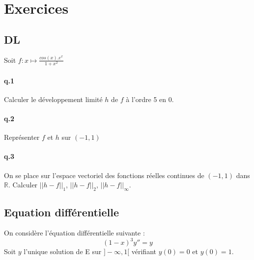 \documentclass[10pt,a4paper]{article}
\begin{document}
%
%
%
%



\section{Exercices}
\subsection{DL}
Soit $f: x \mapsto \frac{cos(x).e^x}{1+x^2} $
\paragraph{q.1} Calculer le développement limité $h$ de $f$ à l'ordre 5 en 0.
\paragraph{q.2} Représenter $f$ et $h$ sur $(-1,1)$ 
\paragraph{q.3} On se place sur l'espace vectoriel des fonctions réelles continues de $(-1,1)$ dans $\mathbb{R}$. 
Calculer $||h-f||_1$, $||h-f||_2$, $||h-f||_\infty$.


%
%
\subsection{Equation différentielle}
On considère l’équation différentielle suivante :
$$(1 − x)^3 y'' = y$$
Soit $y$ l’unique solution de E sur $] −\infty , 1[$ vérifiant $y(0) = 0$ et $y (0) = 1$.
\end{document}
